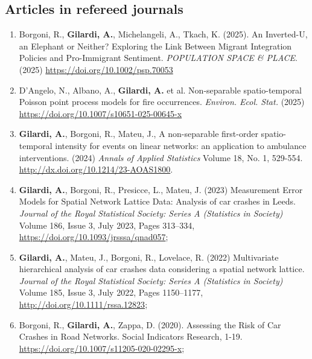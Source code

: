 \documentclass[11pt,a4paper,sans]{moderncv}
\begin{document}
  \subsection{Articles in refereed journals}
  \begin{enumerate}
  	\item Borgoni, R., \textbf{Gilardi, A.}, Michelangeli, A., Tkach, K. (2025). An Inverted-U, an Elephant or Neither? Exploring the Link Between Migrant Integration Policies and Pro-Immigrant Sentiment. \emph{POPULATION SPACE \& PLACE}. (2025) \url{https://doi.org/10.1002/psp.70053}
  	\item D’Angelo, N., Albano, A., \textbf{Gilardi, A.} et al. Non-separable spatio-temporal Poisson point process models for fire occurrences. \emph{Environ. Ecol. Stat.} (2025) \url{https://doi.org/10.1007/s10651-025-00645-x}
  	\item \textbf{Gilardi, A.}, Borgoni, R., Mateu, J., A non-separable first-order spatio-temporal intensity for events on linear networks: an application to ambulance interventions. (2024) \textit{Annals of Applied Statistics} Volume 18, No. 1, 529-554. \url{http://dx.doi.org/10.1214/23-AOAS1800}.
  	\item \textbf{Gilardi, A.}, Borgoni, R., Presicce, L., Mateu, J. (2023) Measurement Error Models for Spatial Network Lattice Data: Analysis of car crashes in Leeds. \textit{Journal of the Royal Statistical Society: Series A (Statistics in Society)} Volume 186, Issue 3, July 2023, Pages 313–334, \url{https://doi.org/10.1093/jrsssa/qnad057};
  	\item \textbf{Gilardi, A.}, Mateu, J., Borgoni, R., Lovelace, R. (2022) Multivariate hierarchical analysis of car crashes data considering a spatial network lattice. \textit{Journal of the Royal Statistical Society: Series A (Statistics in Society)} Volume 185, Issue 3, July 2022, Pages 1150–1177, \url{http://doi.org/10.1111/rssa.12823};
  	\item Borgoni, R., \textbf{Gilardi, A.}, Zappa, D. (2020). Assessing the Risk of Car Crashes in Road Networks. Social Indicators Research, 1-19. \url{https://doi.org/10.1007/s11205-020-02295-x};
  \end{enumerate}
  
\end{document}
